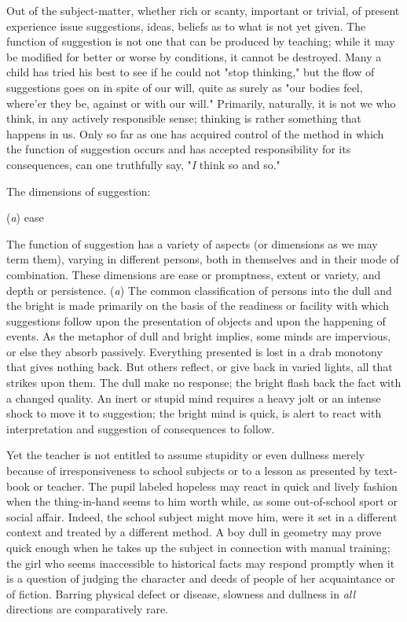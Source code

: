 \documentclass[letterpaper]{book}
\begin{document}
Out of the subject-matter, whether rich or scanty, important or trivial,
of present experience issue suggestions, ideas, beliefs as to what is
not yet given. The function of suggestion is not one that can be
produced by teaching; while it may be modified for better or worse by
conditions, it cannot be destroyed. Many a child has tried his best to
see if he could not "stop thinking," but the flow of suggestions goes on
in spite of our will, quite as surely as "our bodies feel, where'er they
be, against or with our will." Primarily, naturally, it is not we who
think, in any actively responsible sense; thinking is rather something
that happens in us. Only so far as one has acquired control of the
method in which the function of suggestion occurs and has accepted
responsibility for its consequences, can one truthfully say, "\emph{I}
think so and so."

The dimensions of suggestion:

(\emph{a}) ease

The function of suggestion has a variety of aspects (or dimensions as we
may term them), varying in different persons, both in themselves and in
their mode of combination. These dimensions are ease or promptness,
extent or variety, and depth or persistence. (\emph{a}) The common
classification of persons into the dull and the bright is made primarily
on the basis of the readiness or facility with which suggestions follow
upon the
presentation
of objects and upon the happening of events. As the metaphor of dull and
bright implies, some minds are impervious, or else they absorb
passively. Everything presented is lost in a drab monotony that gives
nothing back. But others reflect, or give back in varied lights, all
that strikes upon them. The dull make no response; the bright flash back
the fact with a changed quality. An inert or stupid mind requires a
heavy jolt or an intense shock to move it to suggestion; the bright mind
is quick, is alert to react with interpretation and suggestion of
consequences to follow.

Yet the teacher is not entitled to assume stupidity or even dullness
merely because of irresponsiveness to school subjects or to a lesson as
presented by text-book or teacher. The pupil labeled hopeless may react
in quick and lively fashion when the thing-in-hand seems to him worth
while, as some out-of-school sport or social affair. Indeed, the school
subject might move him, were it set in a different context and treated
by a different method. A boy dull in geometry may prove quick enough
when he takes up the subject in connection with manual training; the
girl who seems inaccessible to historical facts may respond promptly
when it is a question of judging the character and deeds of people of
her acquaintance or of fiction. Barring physical defect or disease,
slowness and dullness in \emph{all} directions are comparatively rare.
\end{document}

